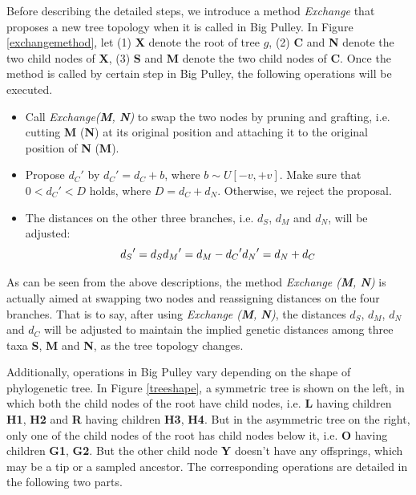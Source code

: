 \documentclass{bmcart}
\begin{document}
Before describing the detailed steps, we introduce a method \textit{Exchange} that proposes a new tree topology when it is called in Big Pulley. In Figure \ref{exchangemethod}, let (1) \textbf{X} denote the root of tree $g$, (2) \textbf{C} and \textbf{N} denote the two child nodes of \textbf{X}, (3) \textbf{S} and \textbf{M} denote the two child nodes of \textbf{C}. Once the method is called by certain step in Big Pulley, the following operations will be executed.
\begin{itemize}
\item Call \textit{Exchange(\textbf{M}, \textbf{N})} to swap the two nodes by pruning and grafting, i.e. cutting \textbf{M} (\textbf{N}) at its original position and attaching it to the original position of \textbf{N} (\textbf{M}).
\item Propose ${d_C}'$ by ${d_C}' = {d_C} + b$, where $b \sim U[ - v, + v]$. Make sure that $0 < {d_C}' < D$ holds, where $D = {d_C} + {d_{N}}$. Otherwise, we reject the proposal.
\item The distances on the other three branches, i.e. $d_S$, $d_{M}$ and $d_{N}$, will be adjusted:
\begin{equation}\label{big_dis}
{d_S}' = {d_S}\\
{d_{M}}' = {d_{M}} - {d_C}'\\
{d_{N}}' = {d_{N}} + {d_C}
\end{equation}
\end{itemize}

As can be seen from the above descriptions, the method \textit{Exchange (\textbf{M}, \textbf{N})} is actually aimed at swapping two nodes and reassigning distances on the four branches. That is to say, after using \textit{Exchange (\textbf{M}, \textbf{N})}, the distances $d_S$, $d_{M}$, $d_{N}$ and $d_{C}$ will be adjusted to maintain the implied genetic distances among three taxa \textbf{S}, \textbf{M} and \textbf{N}, as the tree topology changes.

Additionally, operations in Big Pulley vary depending on the shape of phylogenetic tree. In Figure \ref{treeshape}, a symmetric tree is shown on the left, in which both the child nodes of the root have child nodes, i.e. \textbf{L} having children \textbf{H1}, \textbf{H2} and \textbf{R} having children \textbf{H3}, \textbf{H4}. But in the asymmetric tree on the right, only one of the child nodes of the root has child nodes below it, i.e. \textbf{O} having children \textbf{G1}, \textbf{G2}. But the other child node \textbf{Y} doesn't have any offsprings, which may be a tip or a sampled ancestor. The corresponding operations are detailed in the following two parts.
\end{document}
